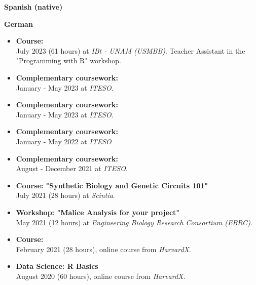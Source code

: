 \documentclass{simplecv}
\begin{document}
    
\newpage
\setlength\columnsep{0.33in}
\begin{multicols}{2}
\vspace{-8pt}
\textbf{Spanish (native)}\\

\medskip

\textbf{German}\\

\bigskip

\vspace{-8pt}
{\small
  \begin{itemize}[leftmargin=*]
  \setlength{\itemsep}{6pt}
    \item \textbf{Course: }\\July 2023 (61 hours) at \textit{IBt - UNAM (USMBB)}. Teacher Assistant in the "Programming with R" workshop.
    \item \textbf{Complementary coursework: }\\January - May 2023 at \textit{ITESO}.
    \item \textbf{Complementary coursework: }\\January - May 2023 at \textit{ITESO}.
    \item \textbf{Complementary coursework:  }\\January - May 2022 at \textit{ITESO}
    \item \textbf{Complementary coursework: }\\August - December 2021 at \textit{ITESO}.
    \item \textbf{Course: "Synthetic Biology and Genetic Circuits 101"}\\July 2021 (28 hours) at \textit{Scintia}.
    \item \textbf{Workshop: "Malice Analysis for your project"}\\May 2021 (12 hours) at \textit{Engineering Biology Research Consortium (EBRC)}.
    \item \textbf{Course: }\\February 2021 (28 hours), online course from \textit{HarvardX}.
    \item \textbf{Data Science: R Basics}\\August 2020 (60 hours), online course from \textit{HarvardX}.
  \end{itemize}
}


\end{multicols}
\end{document}
